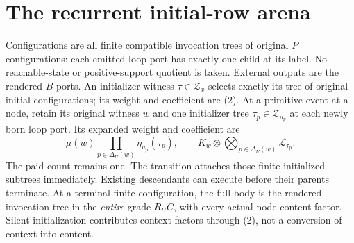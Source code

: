 \documentclass[11pt]{article}
\begin{document}
\section{The recurrent initial-row arena}
Configurations are all finite compatible invocation trees of original $P$ configurations: each emitted loop port has exactly one child at its label. No reachable-state or positive-support quotient is taken. External outputs are the rendered $B$ ports. An initializer witness $\tau\in\mathcal Z_x$ selects exactly its tree of original initial configurations; its weight and coefficient are (2). At a primitive event at a node, retain its original witness $w$ and one initializer tree $\tau_p\in\mathcal Z_{u_p}$ at each newly born loop port. Its expanded weight and coefficient are
\[
 \mu(w)\prod_{p\in\Delta_U(w)}\eta_{u_p}(\tau_p),
 \qquad K_w\otimes\bigotimes_{p\in\Delta_U(w)}\mathcal L_{\tau_p}.
                                                               \tag{3}
\]
The paid count remains one. The transition attaches those finite initialized subtrees immediately. Existing descendants can execute before their parents terminate. At a terminal finite configuration, the full body is the rendered invocation tree in the \emph{entire} grade $R_UC$, with every actual node content factor. Silent initialization contributes context factors through (2), not a conversion of context into content.
\end{document}
